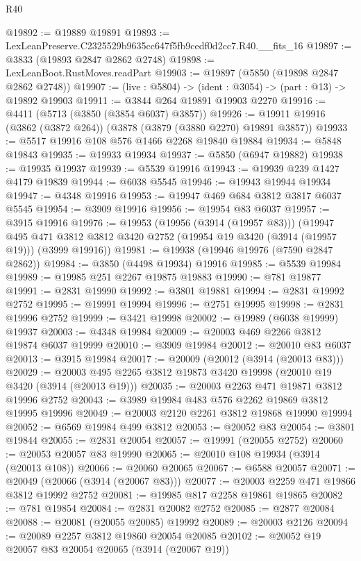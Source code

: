 \begin{lexlean}{R40}
\begin{coremodule}
@19892 := @19889 @19891
@19893 := LexLeanPreserve.C2325529b9635cc647f5fb9cedf0d2cc7.R40.__fits_16
@19897 := @3833 (@19893 @2847 @2862 @2748)
@19898 := LexLeanBoot.RustMoves.readPart
@19903 := @19897 (@5850 (@19898 @2847 @2862 @2748))
@19907 := (live : @5804) -> (ident : @3054) -> (part : @13) -> @19892 @19903
@19911 := @3844 @264 @19891 @19903 @2270
@19916 := @4411 (@5713 (@3850 (@3854 @6037) @3857))
@19926 := @19911 @19916 (@3862 (@3872 @264)) (@3878 (@3879 (@3880 @2270) @19891 @3857))
@19933 := @5517 @19916 @108 @576 @1466 @2268 @19840 @19884
@19934 := @5848 @19843
@19935 := @19933 @19934
@19937 := @5850 (@6947 @19882)
@19938 := @19935 @19937
@19939 := @5539 @19916
@19943 := @19939 @239 @1427 @4179 @19839
@19944 := @6038 @5545
@19946 := @19943 @19944 @19934
@19947 := @4348 @19916
@19953 := @19947 @469 @684 @3812 @3817 @6037 @5545
@19954 := @3909 @19916
@19956 := @19954 @83 @6037
@19957 := @3915 @19916
@19976 := @19953
    (@19956 (@3914 (@19957 @83)))
    (@19947
      @495
      @471
      @3812
      @3812
      @3420
      @2752
      (@19954 @19 @3420 (@3914 (@19957 @19)))
      (@3999 @19916))
@19981 := @19938 (@19946 @19976 (@7590 @2847 @2862))
@19984 := @3850 (@4498 @19934) @19916
@19985 := @5539 @19984
@19989 := @19985 @251 @2267 @19875 @19883
@19990 := @781 @19877
@19991 := @2831 @19990
@19992 := @3801 @19881
@19994 := @2831 @19992 @2752
@19995 := @19991 @19994
@19996 := @2751 @19995
@19998 := @2831 @19996 @2752
@19999 := @3421 @19998
@20002 := @19989 (@6038 @19999) @19937
@20003 := @4348 @19984
@20009 := @20003 @469 @2266 @3812 @19874 @6037 @19999
@20010 := @3909 @19984
@20012 := @20010 @83 @6037
@20013 := @3915 @19984
@20017 := @20009 (@20012 (@3914 (@20013 @83)))
@20029 := @20003 @495 @2265 @3812 @19873 @3420 @19998 (@20010 @19 @3420 (@3914 (@20013 @19)))
@20035 := @20003 @2263 @471 @19871 @3812 @19996 @2752
@20043 := @3989 @19984 @483 @576 @2262 @19869 @3812 @19995 @19996
@20049 := @20003 @2120 @2261 @3812 @19868 @19990 @19994
@20052 := @6569 @19984 @499 @3812
@20053 := @20052 @83
@20054 := @3801 @19844
@20055 := @2831 @20054
@20057 := @19991 (@20055 @2752)
@20060 := @20053 @20057 @83 @19990
@20065 := @20010 @108 @19934 (@3914 (@20013 @108))
@20066 := @20060 @20065
@20067 := @6588 @20057
@20071 := @20049 (@20066 (@3914 (@20067 @83)))
@20077 := @20003 @2259 @471 @19866 @3812 @19992 @2752
@20081 := @19985 @817 @2258 @19861 @19865
@20082 := @781 @19854
@20084 := @2831 @20082 @2752
@20085 := @2877 @20084
@20088 := @20081 (@20055 @20085) @19992
@20089 := @20003 @2126
@20094 := @20089 @2257 @3812 @19860 @20054 @20085
@20102 := @20052 @19 @20057 @83 @20054 @20065 (@3914 (@20067 @19))

\end{coremodule}
\end{lexlean}
